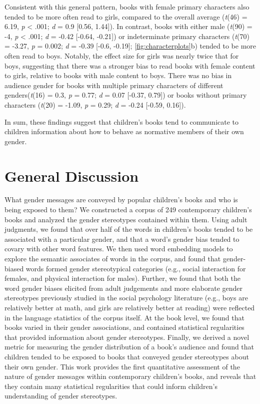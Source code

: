 \documentclass[english,,man,floatsintext]{apa6}
\begin{document}
Consistent with this general pattern, books with female primary characters also tended to be more often read to girls, compared to the overall average (\emph{t}(46) = 6.19, \emph{p} \textless{} .001; \emph{d} = 0.9 {[}0.56, 1.44{]}). In contrast, books with either male (\emph{t}(90) = -4, \emph{p} \textless{} .001; \emph{d} = -0.42 {[}-0.64, -0.21{]}) or indeterminate primary characters (\emph{t}(70) = -3.27, \emph{p} = 0.002; \emph{d} = -0.39 {[}-0.6, -0.19{]}; \autoref{fig:characterplots}b) tended to be more often read to boys. Notably, the effect size for girls was nearly twice that for boys, suggesting that there was a stronger bias to read books with female content to girls, relative to books with male content to boys. There was no bias in audience gender for books with multiple primary characters of different genders(\emph{t}(16) = 0.3, \emph{p} = 0.77; \emph{d} = 0.07 {[}-0.37, 0.79{]}) or books without primary characters (\emph{t}(20) = -1.09, \emph{p} = 0.29; \emph{d} = -0.24 {[}-0.59, 0.16{]}).

In sum, these findings suggest that children's books tend to communicate to children information about how to behave as normative members of their own gender.

\hypertarget{general-discussion}{%
\section{General Discussion}\label{general-discussion}}

What gender messages are conveyed by popular children's books and who is being exposed to them? We constructed a corpus of 249 contemporary children's books and analyzed the gender stereotypes contained within them. Using adult judgments, we found that over half of the words in children's books tended to be associated with a particular gender, and that a word's gender bias tended to covary with other word features. We then used word embedding models to explore the semantic associates of words in the corpus, and found that gender-biased words formed gender stereotypical categories (e.g., social interaction for females, and physical interaction for males). Further, we found that both the word gender biases elicited from adult judgements and more elaborate gender stereotypes previously studied in the social psychology literature (e.g., boys are relatively better at math, and girls are relatively better at reading) were reflected in the language statistics of the corpus itself. At the book level, we found that books varied in their gender associations, and contained statistical regularities that provided information about gender stereotypes. Finally, we derived a novel metric for measuring the gender distribution of a book's audience and found that children tended to be exposed to books that conveyed gender stereotypes about their own gender. This work provides the first quantitative assessment of the nature of gender messages within contemporary children's books, and reveals that they contain many statistical regularities that could inform children's understanding of gender stereotypes.
\end{document}

